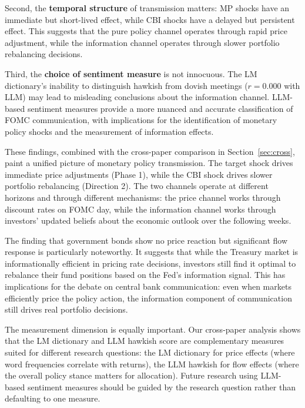 \documentclass[11pt,a4paper]{article}
\begin{document}
Second, the \textbf{temporal structure} of transmission matters: MP shocks have an immediate but short-lived effect, while CBI shocks have a delayed but persistent effect. This suggests that the pure policy channel operates through rapid price adjustment, while the information channel operates through slower portfolio rebalancing decisions.

Third, the \textbf{choice of sentiment measure} is not innocuous. The LM dictionary's inability to distinguish hawkish from dovish meetings ($r = 0.000$ with LLM) may lead to misleading conclusions about the information channel. LLM-based sentiment measures provide a more nuanced and accurate classification of FOMC communication, with implications for the identification of monetary policy shocks and the measurement of information effects.

These findings, combined with the cross-paper comparison in Section~\ref{sec:cross}, paint a unified picture of monetary policy transmission. The target shock drives immediate price adjustments (Phase 1), while the CBI shock drives slower portfolio rebalancing (Direction 2). The two channels operate at different horizons and through different mechanisms: the price channel works through discount rates on FOMC day, while the information channel works through investors' updated beliefs about the economic outlook over the following weeks.

The finding that government bonds show no price reaction but significant flow response is particularly noteworthy. It suggests that while the Treasury market is informationally efficient in pricing rate decisions, investors still find it optimal to rebalance their fund positions based on the Fed's information signal. This has implications for the debate on central bank communication: even when markets efficiently price the policy action, the information component of communication still drives real portfolio decisions.

The measurement dimension is equally important. Our cross-paper analysis shows that the LM dictionary and LLM hawkish score are complementary measures suited for different research questions: the LM dictionary for price effects (where word frequencies correlate with returns), the LLM hawkish for flow effects (where the overall policy stance matters for allocation). Future research using LLM-based sentiment measures should be guided by the research question rather than defaulting to one measure.
\end{document}
